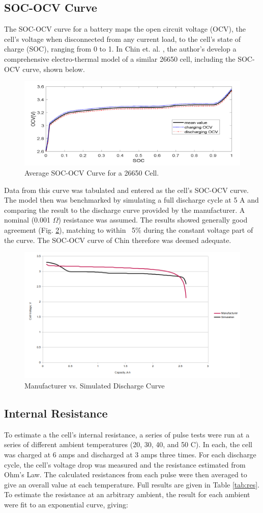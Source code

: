 \documentclass[conf]{new-aiaa}
\begin{document}
\subsection{SOC-OCV Curve}
The SOC-OCV curve for a battery maps the open circuit voltage (OCV), the cell's voltage when disconnected from any current load, to the cell's state of charge (SOC), ranging from 0 to 1.  In Chin et. al. \cite{Chin}, the author's develop a comprehensive electro-thermal model of a similar 26650 cell, including the SOC-OCV curve, shown below.

\begin{figure}[hbt!]
\centering
\includegraphics[width=.5\textwidth]{Fig2}
\caption{Average SOC-OCV Curve for a 26650 Cell. \cite{Chin}}
\label{fig:SOCOCV}
\end{figure}

Data from this curve was tabulated and entered as the cell's SOC-OCV curve.  The model then was benchmarked by simulating a full discharge cycle at 5 A and comparing the result to the discharge curve provided by the manufacturer.  A nominal (0.001 $\Omega$) resistance was assumed.  The results showed generally good agreement (Fig. \ref{fig:ManDischarge}), matching to within ~5\% during the constant voltage part of the curve.  The SOC-OCV curve of Chin therefore was deemed adequate.

\begin{figure}[hbt!]
\centering
\includegraphics[width=.5\textwidth]{Fig3}
\caption{Manufacturer vs. Simulated Discharge Curve}
\label{fig:ManDischarge}
\end{figure}

\subsection{Internal Resistance}
To estimate a the cell's internal resistance, a series of pulse tests were run at a series of different ambient temperatures (20, 30, 40, and 50 \textdegree C).  In each, the cell was charged at 6 amps and discharged at 3 amps three times.  For each discharge cycle, the cell's voltage drop was measured and the resistance estimated from Ohm's Law.  The calculated resistances from each pulse were then averaged to give an overall value at each temperature.  Full results are given in Table \ref{tab:res}.  To estimate the resistance at an arbitrary ambient, the result for each ambient were fit to an exponential curve, giving:
\end{document}
